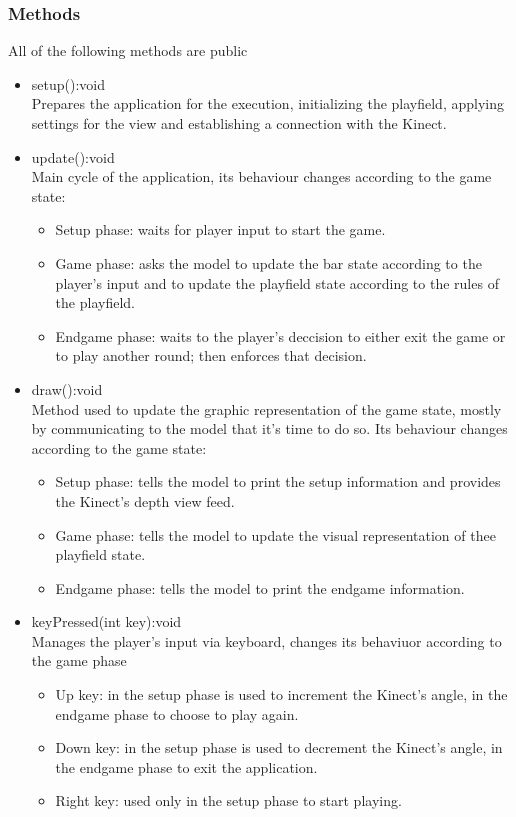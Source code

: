\documentclass[]{article}
\begin{document}
\subsubsection{Methods}
All of the following methods are public
	\begin{itemize}
		\item setup():void \\ Prepares the application for the execution, initializing the playfield, applying settings for the view and establishing a connection with the Kinect.
		\item update():void \\ Main cycle of the application, its behaviour changes according to the game state:
			\begin{itemize}
				\item Setup phase: waits for player input to start the game.
				\item Game phase: asks the model to update the bar state according to the player's input and to update the playfield state according to the rules of the playfield.
				\item Endgame phase: waits to the player's deccision to either exit the game or to play another round; then enforces that decision.
			 \end{itemize}
		\item draw():void \\ Method used to update the graphic representation of the game state, mostly by communicating to the model that it's time to do so. Its behaviour changes according to the game state:
			 \begin{itemize}
				 \item Setup phase: tells the model to print the setup information and provides the Kinect's depth view feed.
				 \item Game phase: tells the model to update the visual representation of thee playfield state.
				 \item Endgame phase: tells the model to print the endgame information.
			 \end{itemize}
		\item keyPressed(int key):void \\ Manages the player's input via keyboard, changes its behaviuor according to the game phase
			 \begin{itemize}
				\item Up key: in the setup phase is used to increment the Kinect's angle, in the endgame phase to choose to play again.
				\item Down key: in the setup phase is used to decrement the Kinect's angle, in the endgame phase to exit the application.
				\item Right key: used only in the setup phase to start playing. 
			 \end{itemize}
	\end{itemize}
\newpage
\end{document}
